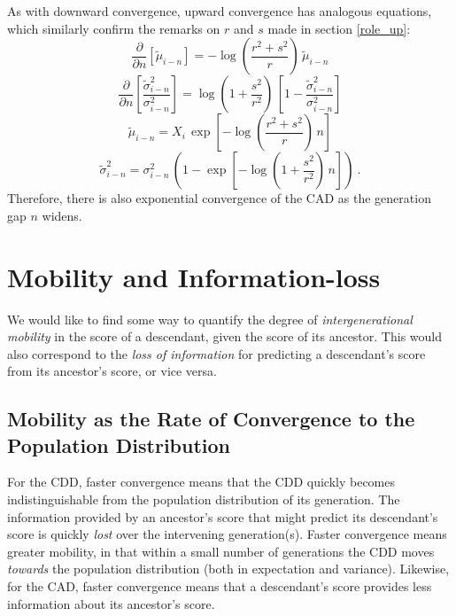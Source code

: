 \documentclass{svproc} %
\begin{document}
As with downward convergence, upward convergence has analogous equations, which similarly confirm the remarks on $r$ and $s$ made in section \ref{role_up}:
\begin{equation}
\frac{\partial}{\partial n}[\tilde{\mu}_{i-n}] = -\log(\frac{r^2 + s^2}{r}) \, \tilde{\mu}_{i-n} 
\label{eq:partial_a_mean}
\end{equation}
%
\begin{equation}
\frac{\partial }{\partial n}[\frac{\tilde{\sigma}_{i-n}^2}{\sigma_{i-n}^2}] = \log(1+\frac{s^2}{r^2}) \, [1 - \frac{\tilde{\sigma}_{i-n}^2}{\sigma_{i-n}^2}] 
\label{eq:partial_a_var}
\end{equation}
%
\begin{equation}
\tilde{\mu}_{i-n} = X_i \, \exp[-\log(\frac{r^2 + s^2}{r}) \, n] 
\label{eq:expo_a_mean}
\end{equation}
%
\begin{equation}
\tilde{\sigma}_{i-n}^2 = \sigma_{i-n}^2 \, (1 - \exp[-\log(1+\frac{s^2}{r^2}) \, n]) \ .
\label{eq:expo_a_var}
\end{equation}
Therefore, there is also exponential convergence of the CAD as the generation gap $n$ widens. 



\section{Mobility and Information-loss}

We would like to find some way to quantify the degree of \emph{intergenerational mobility} in the score of a descendant, given the score of its ancestor. This would also correspond to the \emph{loss of information} for predicting a descendant's score from its ancestor's score, or vice versa.

\subsection{Mobility as the Rate of Convergence to the Population Distribution}
For the CDD, faster convergence means that the CDD quickly becomes indistinguishable from the population distribution of its generation. The information provided by an ancestor's score that might predict its descendant's score is quickly \emph{lost} over the intervening generation(s). Faster convergence means greater mobility, in that within a small number of generations the CDD moves \emph{towards} the population distribution (both in expectation and variance). Likewise, for the CAD, faster convergence means that a descendant's score provides less information about its ancestor's score. 
\end{document}

